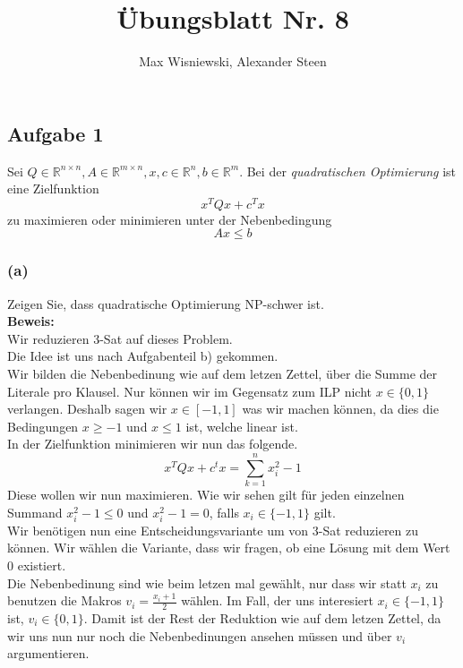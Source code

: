 \documentclass[11pt,a4paper,ngerman]{article}
\date{}
\title{Übungsblatt Nr. 8}
\author{Max Wisniewski, Alexander Steen}
\begin{document}
\renewcommand{\figurename}{Figure}
\maketitle
\thispagestyle{fancy}

    
\subsection*{Aufgabe 1}

Sei $Q \in \mathbb{R}^{n\times n}, A \in \mathbb{R}^{m \times n}, x,c \in \mathbb{R}^n, b \in \mathbb{R}^m$.
Bei der \emph{quadratischen Optimierung} ist eine Zielfunktion
$$
    x^T Q x + c^Tx
$$
zu maximieren oder minimieren unter der Nebenbedingung
$$
   A x \leq b
$$
\subsubsection*{(a)}
Zeigen Sie, dass quadratische Optimierung NP-schwer ist.\\

\textbf{Beweis:}\\
Wir reduzieren 3-Sat auf dieses Problem.\\

Die Idee ist uns nach Aufgabenteil b) gekommen.\\
Wir bilden die Nebenbedinung wie auf dem letzen Zettel, über die Summe der Literale pro Klausel. Nur können wir
im Gegensatz zum ILP nicht $x \in \{ 0 , 1 \}$ verlangen. Deshalb sagen wir $x \in [-1, 1]$ was wir machen können,
da dies die Bedingungen $x \geq -1$ und $x \leq 1$ ist, welche linear ist.\\

In der Zielfunktion minimieren wir nun das folgende.
$$
    x^T Q x + c^tx = \overset{n}{\underset{k=1}{\sum}} x_i^2 - 1
$$
Diese wollen wir nun maximieren. Wie wir sehen gilt für jeden einzelnen Summand $x_i^2 - 1 \leq 0$ und $x_i^2 - 1 = 0$,
falls $x_i \in \{ -1 , 1\}$ gilt.\\

Wir benötigen nun eine Entscheidungsvariante um von 3-Sat reduzieren zu können. Wir wählen die Variante, dass wir fragen,
ob eine Lösung mit dem Wert $0$ existiert.\\

Die Nebenbedinung sind wie beim letzen mal gewählt, nur dass wir statt $x_i$ zu benutzen
die Makros $v_i = \frac{x_i + 1}{2}$ wählen. Im Fall, der uns interesiert $x_i \in \{-1 , 1\}$ ist, $v_i \in \{ 0, 1 \}$.
Damit ist der Rest der Reduktion wie auf dem letzen Zettel, da wir uns nun nur noch die Nebenbedinungen ansehen müssen
und über $v_i$ argumentieren.
\end{document}
